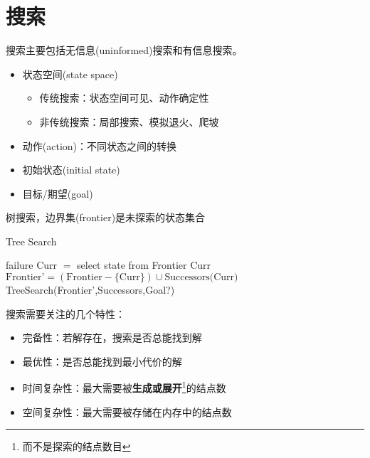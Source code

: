 
\section{搜索}

搜索主要包括无信息(uninformed)搜索和有信息搜索。
\begin{itemize}
	\item 状态空间(state space)
	\begin{itemize}
		\item 传统搜索：状态空间可见、动作确定性
		\item 非传统搜索：局部搜索、模拟退火、爬坡
	\end{itemize}
	\item 动作(action)：不同状态之间的转换
	\item 初始状态(initial state)
	\item 目标/期望(goal)
\end{itemize}

树搜索，边界集(frontier)是未探索的状态集合
\begin{algorithm}[H]
\caption{Tree Search}
\begin{algorithmic}[1]
\State \Return failure
\EndIf
\State Curr $=$ select state from Frontier
\State \Return Curr
\EndIf
\State $\text{Frontier'} = (\text{Frontier} - \{\text{Curr}\}) \cup \text{Successors(Curr)}$
\State \Return TreeSearch(Frontier',Successors,Goal?)
\EndProcedure
\end{algorithmic}
\end{algorithm}

搜索需要关注的几个特性：
\begin{itemize}
	\item 完备性：若解存在，搜索是否总能找到解
	\item 最优性：是否总能找到最小代价的解
	\item 时间复杂性：最大需要被\textbf{生成或展开}\footnote{而不是探索的结点数目}的结点数
	\item 空间复杂性：最大需要被存储在内存中的结点数
\end{itemize}

